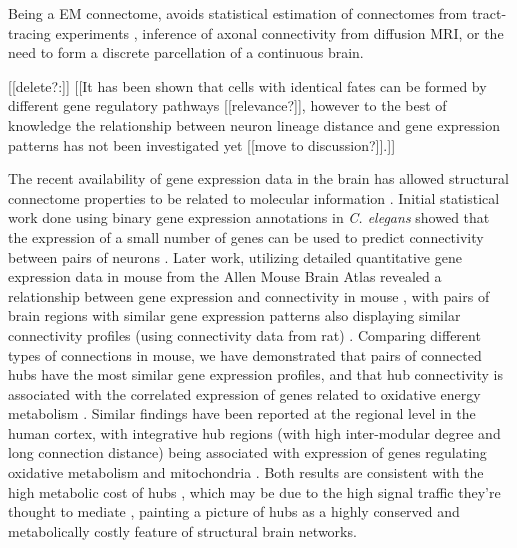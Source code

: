 \documentclass[10pt,letterpaper]{article}
\begin{document}
Being a EM connectome, avoids statistical estimation of connectomes from tract-tracing experiments \cite{Ypma:2016em}, inference of axonal connectivity from diffusion MRI, or the need to form a discrete parcellation of a continuous brain.

[[delete?:]]
[[It has been shown that cells with identical fates can be formed by different gene regulatory pathways \cite{Liu2009} [[relevance?]], however to the best of knowledge the relationship between neuron lineage distance and gene expression patterns has not been investigated yet [[move to discussion?]].]]

The recent availability of gene expression data in the brain has allowed structural connectome properties to be related to molecular information \cite{vandenHeuvel:2017ex}.
Initial statistical work done using binary gene expression annotations in \emph{C. elegans} showed that the expression of a small number of genes can be used to predict connectivity between pairs of neurons \cite{Varadan:2006ek, Kaufman2006, Baruch2008b}.
Later work, utilizing detailed quantitative gene expression data in mouse from the Allen Mouse Brain Atlas \cite{Lein:2007jn} revealed a relationship between gene expression and connectivity in mouse \cite{Ji:2014jw, Fakhry:2015kl}, with pairs of brain regions with similar gene expression patterns also displaying similar connectivity profiles (using connectivity data from rat) \cite{French2011}.
Comparing different types of connections in mouse, we have demonstrated that pairs of connected hubs have the most similar gene expression profiles, and that hub connectivity is associated with the correlated expression of genes related to oxidative energy metabolism \cite{Fulcher:2016ck}.
Similar findings have been reported at the regional level in the human cortex, with integrative hub regions (with high inter-modular degree and long connection distance) being associated with expression of genes regulating oxidative metabolism and mitochondria \cite{Vertes2016a}.
Both results are consistent with the high metabolic cost of hubs \cite{Collin:2014kq, Tomasi:2013kl}, which may be due to the high signal traffic they're thought to mediate \cite{vandenHeuvel:2012kh, Misic:2014it}, painting a picture of hubs as a highly conserved and metabolically costly feature of structural brain networks.
\end{document}

